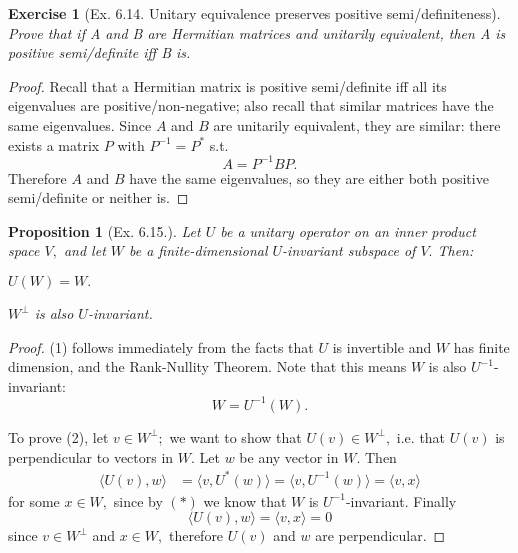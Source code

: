 \documentclass[14pt]{extarticle}
\let\oldBeginEnumerate=\enumerate
\let\oldEndEnumerate=\endenumerate
\renewenvironment{enumerate}{
\oldBeginEnumerate
  \setlength{\itemsep}{0pt}
  \setlength{\parskip}{0pt}
  \setlength{\parsep}{0pt}
}{\oldEndEnumerate}
\theoremstyle{plain}
\newtheorem{proposition}[theorem]{Proposition}
\newtheorem{exercise}[theorem]{Exercise}
\theoremstyle{definition}
\theoremstyle{remark}
\newcommand{\0}{\varnothing}
\newcommand{\<}{\langle}
\renewcommand{\>}{\rangle}
\begin{document}
\begin{exercise}[Ex. 6.14. Unitary equivalence preserves positive semi/definiteness]
Prove that if A and B are Hermitian matrices and unitarily equivalent, then A is positive semi/definite iff B is.
\end{exercise}

\begin{proof}
Recall that a Hermitian matrix is positive semi/definite iff all its eigenvalues are positive/non-negative; also recall that similar matrices have the same eigenvalues. Since $ A $ and $ B $ are unitarily equivalent, they are similar: there exists a matrix $ P $ with $ P^{-1} = P^{*} $ s.t. $$
  A = P^{-1} B P.
$$
Therefore $ A $ and $ B $ have the same eigenvalues, so they are either both positive semi/definite or neither is.
\end{proof}

\begin{proposition}[Ex. 6.15.]
Let $ U $ be a unitary operator on an inner product space $ V, $ and let $ W $ be a finite-dimensional $ U $-invariant subspace of $ V. $ Then:
\begin{enumerate}
  \item $ U(W) = W. $
  \item $ W^\perp $ is also $ U $-invariant.
\end{enumerate}
\end{proposition}

\begin{proof}
(1) follows immediately from the facts that $ U $ is invertible and $ W $ has finite dimension, and the Rank-Nullity Theorem. Note that this means $ W $ is also $ U^{-1} $-invariant: \[
W = U^{-1} (W).\tag{$ * $}
\]

To prove (2), let $ v \in W^{\perp};$ we want to show that $ U(v) \in W^\perp, $ i.e. that $ U(v) $ is perpendicular to vectors in $ W. $ Let $ w $ be any vector in $ W. $ Then \begin{align*}
\< U(v), w \> &= \< v, U^*(w) \> = \< v, U^{-1}(w) \> = \< v, x \>
\end{align*}
for some $ x \in W, $ since by $ (*) $ we know that $ W $ is $ U^{-1} $-invariant. Finally \[
  \< U(v), w \> = \< v, x \> = 0
\]
since $ v \in W^{\perp} $ and $ x \in W, $ therefore $ U(v) $ and $ w $ are perpendicular.
\end{proof}
\end{document}
